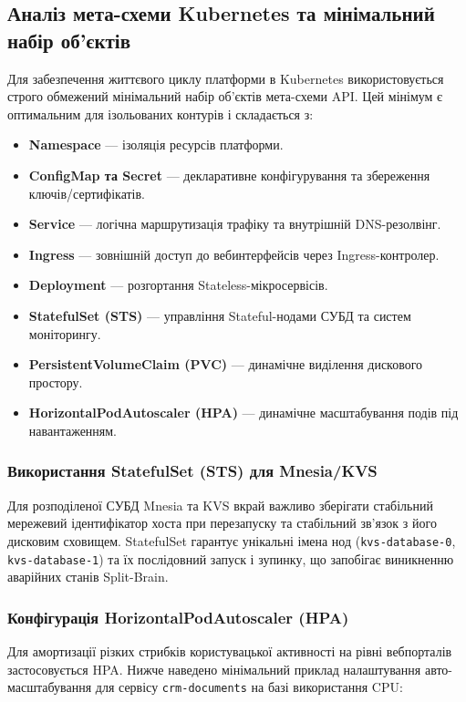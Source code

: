 \documentclass{article}
\begin{document}
\subsection{Аналіз мета-схеми Kubernetes та мінімальний набір об'єктів}
Для забезпечення життєвого циклу платформи в Kubernetes використовується строго обмежений мінімальний набір об'єктів мета-схеми API. Цей мінімум є оптимальним для ізольованих контурів і складається з:

\begin{itemize}
    \item \textbf{Namespace} --- ізоляція ресурсів платформи.
    \item \textbf{ConfigMap та Secret} --- декларативне конфігурування та збереження ключів/сертифікатів.
    \item \textbf{Service} --- логічна маршрутизація трафіку та внутрішній DNS-резолвінг.
    \item \textbf{Ingress} --- зовнішній доступ до вебинтерфейсів через Ingress-контролер.
    \item \textbf{Deployment} --- розгортання Stateless-мікросервісів.
    \item \textbf{StatefulSet (STS)} --- управління Stateful-нодами СУБД та систем моніторингу.
    \item \textbf{PersistentVolumeClaim (PVC)} --- динамічне виділення дискового простору.
    \item \textbf{HorizontalPodAutoscaler (HPA)} --- динамічне масштабування подів під навантаженням.
\end{itemize}

\subsubsection{Використання StatefulSet (STS) для Mnesia/KVS}
Для розподіленої СУБД Mnesia та KVS вкрай важливо зберігати стабільний мережевий ідентифікатор хоста при перезапуску та стабільний зв'язок з його дисковим сховищем. StatefulSet гарантує унікальні імена нод (\texttt{kvs-database-0}, \texttt{kvs-database-1}) та їх послідовний запуск і зупинку, що запобігає виникненню аварійних станів Split-Brain.

\subsubsection{Конфігурація HorizontalPodAutoscaler (HPA)}
Для амортизації різких стрибків користувацької активності на рівні вебпорталів застосовується HPA. Нижче наведено мінімальний приклад налаштування авто-масштабування для сервісу \texttt{crm-documents} на базі використання CPU:
\end{document}
